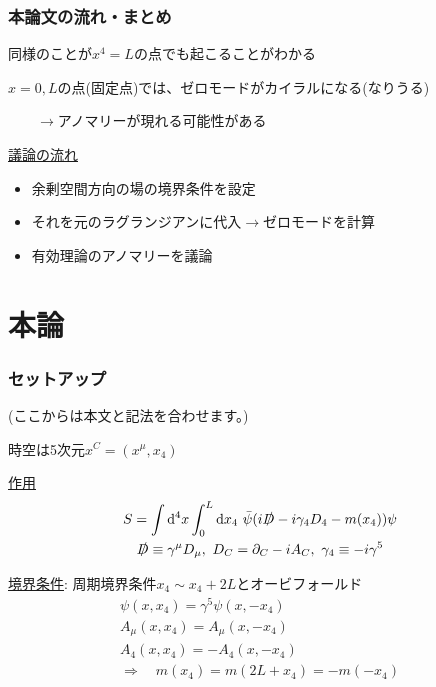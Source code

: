 \documentclass[
  unicode,a4paper,10pt,
  xcolor = {dvipsnames,svgnames},
  hyperref ={colorlinks=true,citecolor=Navy,linkcolor=NavyBlue,urlcolor=purple},
  ja=standard,lualatex
]{beamer}
\begin{document}
\begin{frame}
  \frametitle{本論文の流れ・まとめ}

  同様のことが$x^{4}=L$の点でも起こることがわかる

  \vspace*{5pt}

  $x=0,L$の点(固定点)では、ゼロモードがカイラルになる(なりうる)

  $\qquad\rightarrow$アノマリーが現れる可能性がある

  \pause
  \vspace*{5pt}

  \uline{議論の流れ}

  \begin{itemize}
    \item 
    余剰空間方向の場の境界条件を設定
    \item 
    それを元のラグランジアンに代入$\rightarrow$ゼロモードを計算
    \item 
    有効理論のアノマリーを議論
  \end{itemize}

\end{frame}


\section{本論}

\begin{frame}[plain]
  \huge \secname
\end{frame}

\begin{frame}
  \frametitle{セットアップ}

  (ここからは本文と記法を合わせます。)

  時空は5次元$x^{C}=(x^{\mu},x_{4})$

  \uline{作用}
  \begin{gather}
    S
    =
    \int\dd^4 x
    \int_{0}^{L}\dd x_{4}\ 
    \bar{\psi}(i\slashed{D}-i\gamma_{4}D_{4}-m(x_{4}))\psi
    \nonumber
    \\
    \slashed{D}
    \equiv
    \gamma^{\mu}D_{\mu}
    ,\ 
    D_{C}
    =
    \partial_{C}-iA_{C}
    ,\ 
    \gamma_{4}
    \equiv
    -i\gamma^{5}
    \nonumber
  \end{gather}


  \uline{境界条件}:  周期境界条件$x_{4}\sim x_{4}+2L$とオービフォールド
  \begin{gather}
    \psi(x,x_{4})
    =
    \gamma^{5}\psi(x,-x_{4})
    \nonumber
    \\
    A_{\mu}(x,x_{4})
    =
    A_{\mu}(x,-x_{4})
    \nonumber
    \\
    A_{4}(x,x_{4})
    =
    -A_{4}(x,-x_{4})
    \nonumber
    \\
    \Rightarrow
    \quad
    m(x_4)
    =
    m(2L+x_4)
    =
    -m(-x_{4})
    \nonumber
  \end{gather}

\end{frame}
\end{document}
